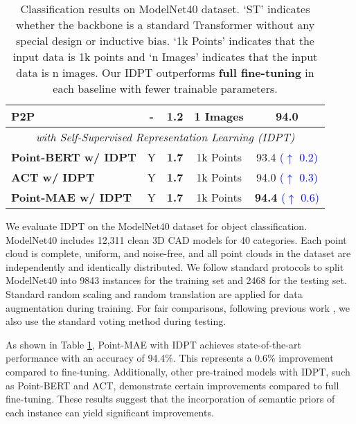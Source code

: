\documentclass[10pt,twocolumn,letterpaper]{article}
\begin{document}
\begin{table}[htbp]
{\begin{tabular}{lcccc}
    P2P \cite{wang2022p2p}   & -     & 1.2   & 1 Images   & 94.0 \\
    \midrule
    \multicolumn{5}{c}{\textit{with Self-Supervised Representation Learning (IDPT)}} \\
    \midrule
    \rowcolor{mycolor}\textbf{Point-BERT w/ IDPT} & Y     & \textbf{1.7} & 1k Points  & 93.4 \textcolor{blue}{($\uparrow$ 0.2)} \\
    \rowcolor{mycolor}\textbf{ACT w/ IDPT} & Y     & \textbf{1.7} & 1k Points  & 94.0 \textcolor{blue}{($\uparrow$ 0.3)} \\
    \rowcolor{mycolor}\textbf{Point-MAE w/ IDPT} & Y     & \textbf{1.7} & 1k Points  & \textbf{94.4} \textcolor{blue}{($\uparrow$ 0.6)} \\
    \bottomrule
    \end{tabular}}
  \caption{Classification results on ModelNet40 \cite{wu20153d} dataset. ‘ST’ indicates whether the backbone is a standard Transformer \cite{vaswani2017attention} without any special design or inductive bias. ‘1k Points’ indicates that the input data is 1k points and ‘n Images’ indicates that the input data is n images. Our IDPT outperforms \textbf{full fine-tuning} in each baseline with fewer trainable parameters.}
  \label{table2}\end{table}

We evaluate IDPT on the ModelNet40 \cite{wu20153d} dataset for object classification. ModelNet40 \cite{wu20153d} includes 12,311 clean 3D CAD models for 40 categories. Each point cloud is complete, uniform, and noise-free, and all point clouds in the dataset are independently and identically distributed. We follow standard protocols to split ModelNet40 into 9843 instances for the training set and 2468 for the testing set. Standard random scaling and random translation are applied for data augmentation during training. For fair comparisons, following previous work \cite{yu2022point,pang2022masked,dong2022autoencoders}, we also use the standard voting method \cite{liu2019relation} during testing. 

As shown in Table \ref{table2}, Point-MAE with IDPT achieves state-of-the-art performance with an accuracy of 94.4\%. This represents a 0.6\% improvement compared to fine-tuning. Additionally, other pre-trained models with IDPT, such as Point-BERT and ACT, demonstrate certain improvements compared to full fine-tuning. These results suggest that the incorporation of semantic priors of each instance can yield significant improvements.
\end{document}
